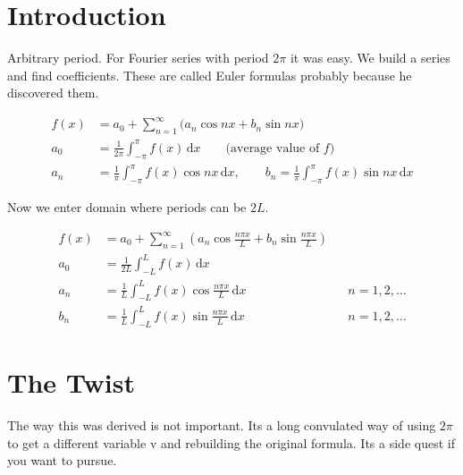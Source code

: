 \documentclass[11pt,a4paper]{article}
\title{\SectionNo\quad \SectionTitle}
\author{Ravikant Pothukuchi}          %
\date{\DateRead}
\newcommand{\dd}{\,\mathrm{d}}                       %
\theoremstyle{definition}
\newtheorem{definition}{Definition}
\theoremstyle{plain}
\begin{document}
\maketitle


\section{Introduction}
Arbitrary period. For Fourier series with period $2\pi$ it was easy. 
We build a series and find coefficients.
These are called Euler formulas probably because he discovered them.

\begin{formulabox}
\begin{align}
  f(x) &= a_0 + \sum_{n=1}^{\infty} \bigl(a_n \cos nx + b_n \sin nx\bigr)\\
  a_0 &= \frac{1}{2\pi}\int_{-\pi}^{\pi} f(x)\dd x \qquad\text{(average value of } f)\\
  a_n &= \frac{1}{\pi}\int_{-\pi}^{\pi} f(x)\cos nx\dd x, \qquad
  b_n = \frac{1}{\pi}\int_{-\pi}^{\pi} f(x)\sin nx\dd x
\end{align}
\end{formulabox}


Now we enter domain where periods can be $2L$. 
\begin{formulabox}
\begin{align*}
  f(x) &= a_0 + \sum_{n=1}^{\infty}\left(a_n \cos\frac{n\pi x}{L} + b_n \sin\frac{n\pi x}{L}\right)\\[6pt]
  a_0 &= \frac{1}{2L}\int_{-L}^{L} f(x)\dd x \tag{0}\\
  a_n &= \frac{1}{L}\int_{-L}^{L} f(x)\cos\frac{n\pi x}{L}\dd x && n = 1, 2, \dots \tag{a}\\
  b_n &= \frac{1}{L}\int_{-L}^{L} f(x)\sin\frac{n\pi x}{L}\dd x && n = 1, 2, \dots \tag{b}
\end{align*}
\end{formulabox}

\section{The Twist}
The way this was derived is not important. Its a long convulated way of using $2\pi$ to get a different variable v and rebuilding the original formula. Its a side quest if you want to pursue.
\end{document}
